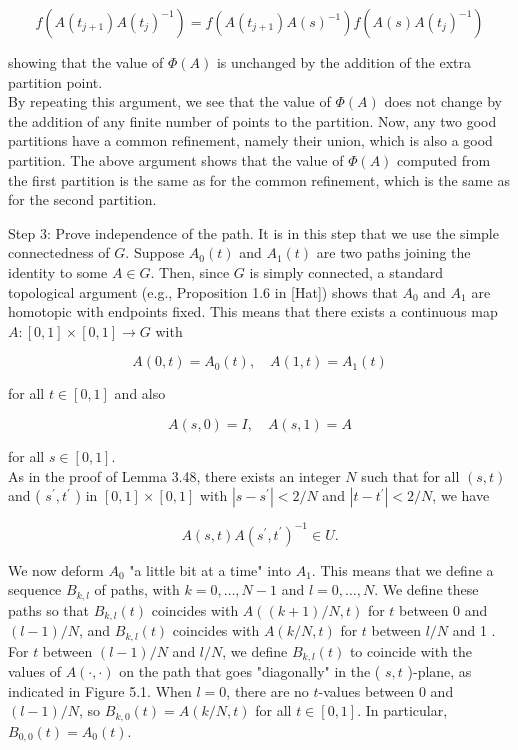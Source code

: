 \documentclass[10pt, letterpaper]{article}
\begin{document}
$$
f\left(A\left(t_{j+1}\right) A\left(t_{j}\right)^{-1}\right)=f\left(A\left(t_{j+1}\right) A(s)^{-1}\right) f\left(A(s) A\left(t_{j}\right)^{-1}\right)
$$

showing that the value of $\Phi(A)$ is unchanged by the addition of the extra partition point.\\
By repeating this argument, we see that the value of $\Phi(A)$ does not change by the addition of any finite number of points to the partition. Now, any two good partitions have a common refinement, namely their union, which is also a good partition. The above argument shows that the value of $\Phi(A)$ computed from the first partition is the same as for the common refinement, which is the same as for the second partition.

Step 3: Prove independence of the path. It is in this step that we use the simple connectedness of $G$. Suppose $A_{0}(t)$ and $A_{1}(t)$ are two paths joining the identity to some $A \in G$. Then, since $G$ is simply connected, a standard topological argument (e.g., Proposition 1.6 in [Hat]) shows that $A_{0}$ and $A_{1}$ are homotopic with endpoints fixed. This means that there exists a continuous map $A:[0,1] \times[0,1] \rightarrow G$ with

$$
A(0, t)=A_{0}(t), \quad A(1, t)=A_{1}(t)
$$

for all $t \in[0,1]$ and also

$$
A(s, 0)=I, \quad A(s, 1)=A
$$

for all $s \in[0,1]$.\\
As in the proof of Lemma 3.48, there exists an integer $N$ such that for all $(s, t)$ and ( $s^{\prime}, t^{\prime}$ ) in $[0,1] \times[0,1]$ with $\left|s-s^{\prime}\right|<2 / N$ and $\left|t-t^{\prime}\right|<2 / N$, we have

$$
A(s, t) A\left(s^{\prime}, t^{\prime}\right)^{-1} \in U .
$$

We now deform $A_{0}$ "a little bit at a time" into $A_{1}$. This means that we define a sequence $B_{k, l}$ of paths, with $k=0, \ldots, N-1$ and $l=0, \ldots, N$. We define these paths so that $B_{k, l}(t)$ coincides with $A((k+1) / N, t)$ for $t$ between 0 and $(l-1) / N$, and $B_{k, l}(t)$ coincides with $A(k / N, t)$ for $t$ between $l / N$ and 1 . For $t$ between $(l-1) / N$ and $l / N$, we define $B_{k, l}(t)$ to coincide with the values of $A(\cdot, \cdot)$ on the path that goes "diagonally" in the ( $s, t$ )-plane, as indicated in Figure 5.1. When $l=0$, there are no $t$-values between 0 and $(l-1) / N$, so $B_{k, 0}(t)=A(k / N, t)$ for all $t \in[0,1]$. In particular, $B_{0,0}(t)=A_{0}(t)$.
\end{document}
